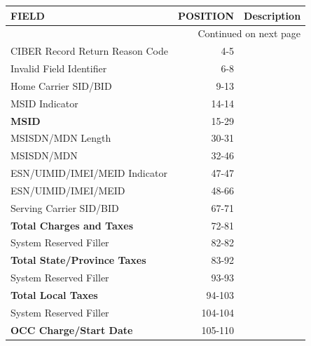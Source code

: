 \documentclass[12pt,twoside]{article}
\begin{document}
\footnotesize
\begin{longtable}{lrr}

\hline
 \textbf{FIELD}                       &  \textbf{POSITION}  &  \textbf{Description} \\
\hline
\endhead
\hline\multicolumn{3}{r}{Continued on next page}\
\endfoot
\endlastfoot
 Return Code                          &                3-3  &                        \\
 CIBER Record Return Reason Code      &                4-5  &                        \\
 Invalid Field Identifier             &                6-8  &                        \\
 Home Carrier SID/BID                 &               9-13  &                        \\
 MSID Indicator                       &              14-14  &                        \\
 \textbf{MSID}                        &              15-29  &                        \\
 MSISDN/MDN Length                    &              30-31  &                        \\
 MSISDN/MDN                           &              32-46  &                        \\
 ESN/UIMID/IMEI/MEID Indicator        &              47-47  &                        \\
 ESN/UIMID/IMEI/MEID                  &              48-66  &                        \\
 Serving Carrier SID/BID              &              67-71  &                        \\
 \textbf{Total Charges and Taxes}     &              72-81  &                        \\
 System Reserved Filler               &              82-82  &                        \\
 \textbf{Total State/Province Taxes}  &              83-92  &                        \\
 System Reserved Filler               &              93-93  &                        \\
 \textbf{Total Local Taxes}           &             94-103  &                        \\
 System Reserved Filler               &            104-104  &                        \\
 \textbf{OCC Charge/Start Date}       &            105-110  &                        \\

\end{longtable}
\end{document}
